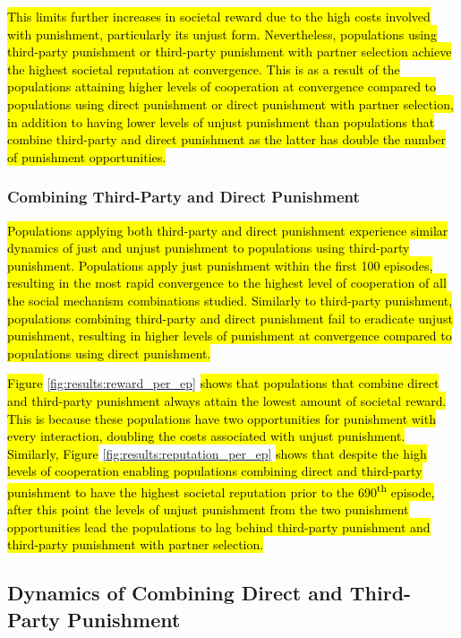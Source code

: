 \documentclass[sn-aps,numbered]{sn-jnl}%
\theoremstyle{thmstyleone}%
\theoremstyle{thmstyletwo}%
\theoremstyle{thmstylethree}%
\begin{document}
\hl{This limits further increases in societal reward due to the high costs involved with punishment, particularly its unjust form. Nevertheless, populations using third-party punishment or third-party punishment with partner selection achieve the highest societal reputation at convergence. This is as a result of the populations attaining higher levels of cooperation at convergence compared to populations using direct punishment or direct punishment with partner selection, in addition to having lower levels of unjust punishment than populations that combine third-party and direct punishment as the latter has double the number of punishment opportunities.}

\subsubsection{Combining Third-Party and Direct Punishment}

\hl{Populations applying both third-party and direct punishment experience similar dynamics of just and unjust punishment to populations using third-party punishment. Populations apply just punishment within the first 100 episodes, resulting in the most rapid convergence to the highest level of cooperation of all the social mechanism combinations studied. Similarly to third-party punishment, populations combining third-party and direct punishment fail to eradicate unjust punishment, resulting in higher levels of punishment at convergence compared to populations using direct punishment. }

\hl{Figure} \ref{fig:results:reward_per_ep} \hl{shows that populations that combine direct and third-party punishment always attain the lowest amount of societal reward. This is because these populations have two opportunities for punishment with every interaction, doubling the costs associated with unjust punishment. Similarly, Figure }\ref{fig:results:reputation_per_ep} \hl{shows that despite the high levels of cooperation enabling populations combining direct and third-party punishment to have the highest societal reputation prior to the 690\textsuperscript{th} episode, after this point the levels of unjust punishment from the two punishment opportunities lead the populations to lag behind third-party punishment and third-party punishment with partner selection.}

\subsection{Dynamics of Combining Direct and Third-Party Punishment}
\end{document}
